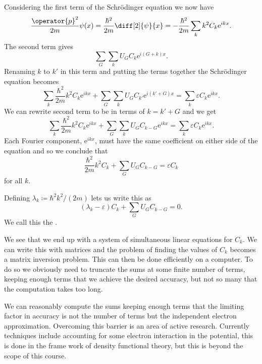 \documentclass[fleqn]{NotesClass}
\newcommand*{\e}{\mathrm{e}}
\begin{document}
    Considering the first term of the Schr\"odinger equation we now have
    \begin{equation}
        \frac{\operator{p}^2}{2m}\psi(x) = \frac{\hbar^2}{2m}\diff[2]{\psi}{x} = -\frac{\hbar^2}{2m}\sum_{k}k^2C_k\e^{ikx}.
    \end{equation}
    The second term gives
    \begin{equation}
        \sum_G\sum_k U_GC_k\e^{i(G + k)x}.
    \end{equation}
    Renaming \(k\) to \(k'\) in this term and putting the terms together the Schr\"odinger equation becomes
    \begin{equation}
        \sum_{k} \frac{\hbar^2}{2m}k^2C_k\e^{ikx} + \sum_G\sum_k U_GC_{k'}\e^{i(k' + G)x} = \sum_{k} \varepsilon C_k\e^{ikx}.
    \end{equation}
    We can rewrite second term to be in terms of \(k = k' + G\) and we get
    \begin{equation}
        \sum_k \frac{\hbar^2}{2m} k^2C_k\e^{ikx} + \sum_G\sum_k U_GC_{k-G}\e^{ikx} = \sum_k \varepsilon C_k\e^{ikx}.
    \end{equation}
    Each Fourier component, \(\e^{ikx}\), must have the same coefficient on either side of the equation and so we conclude that
    \begin{equation}
        \frac{\hbar^2}{2m}k^2C_k + \sum_G U_GC_{k-G} = \varepsilon C_k
    \end{equation}
    for all \(k\).
    
    Defining \(\lambda_k \coloneqq \hbar^2k^2/(2m)\) lets us write this as
    \begin{equation}
        (\lambda_k - \varepsilon)C_k + \sum_G U_GC_{k - G} = 0.
    \end{equation}
    We call this the .
    
    We see that we end up with a system of simultaneous linear equations for \(C_k\).
    We can write this with matrices and the problem of finding the values of \(C_k\) becomes a matrix inversion problem.
    This can then be done efficiently on a computer.
    To do so we obviously need to truncate the sums at some finite number of terms, keeping enough terms that we achieve the desired accuracy, but not so many that the computation takes too long.
    
    We can reasonably compute the sums keeping enough terms that the limiting factor in accuracy is not the number of terms but the independent electron approximation.
    Overcoming this barrier is an area of active research.
    Currently techniques include accounting for some electron interaction in the potential, this is done in the frame work of density functional theory, but this is beyond the scope of this course.
    
\end{document}
